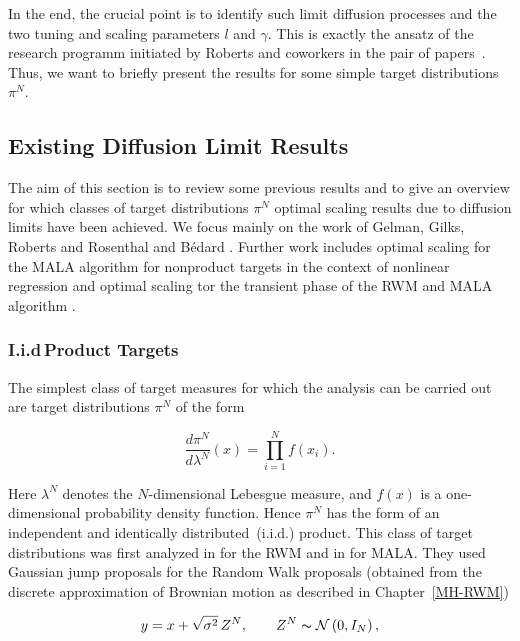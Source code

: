 In the end, the crucial point is to identify such limit diffusion processes and the two tuning and scaling parameters $l$ and $\gamma$. This is exactly the ansatz of the research programm initiated by Roberts and coworkers in the pair of papers~\autocite{Roberts1997, Roberts2001}. Thus, we want to  briefly present the results for some simple target distributions $ \pi^{N} $.


\subsection{Existing Diffusion Limit Results}
\label{CC:Existing results}

The aim of this section is to review some previous results and to give an overview for which classes of target distributions $\pi^{N}$ optimal scaling results due to diffusion limits have been achieved. We focus mainly on the work of  Gelman, Gilks, Roberts and Rosenthal and B\'{e}dard \autocite{Bedard2007, Roberts1997, Roberts2001, Roberts1998}. Further work includes optimal scaling for the MALA algorithm for nonproduct targets in the context of nonlinear regression \autocite{breyer2004} and optimal scaling tor the transient phase of the RWM and MALA algorithm \autocite{Christensen2003, Jourdain2013}.

\subsubsection{I.i.d\,Product Targets} 

The simplest class of target measures for which the analysis can be carried out are target distributions $ \pi^{N} $ of the form

\begin{equation}
 \label{CC:iid product targets}
 \frac{d \pi^{N}}{d \lambda^{N}}(x) = \prod_{i=1}^{N} f(x_i).
\end{equation}

Here $ \lambda^{N} $ denotes the $N$-dimensional Lebesgue measure, and $f(x)$ is a one-dimensional probability density function. Hence $\pi^{N}$ has the form of an independent and identically distributed~(i.i.d.) product. This class of target distributions was first analyzed in \autocite{Roberts1997} for the RWM and in \autocite{Roberts1998} for MALA. They used Gaussian jump proposals for the Random Walk proposals (obtained from the discrete approximation of Brownian motion as described in Chapter~\ref{MH-RWM})

\begin{equation}
 \label{CC:RWMPoposals}
 y = x + \sqrt{\sigma^2}\,Z^{N}, \qquad Z^{N} \thicksim \mathcal{N}\left( 0,I_N \right),
\end{equation}

